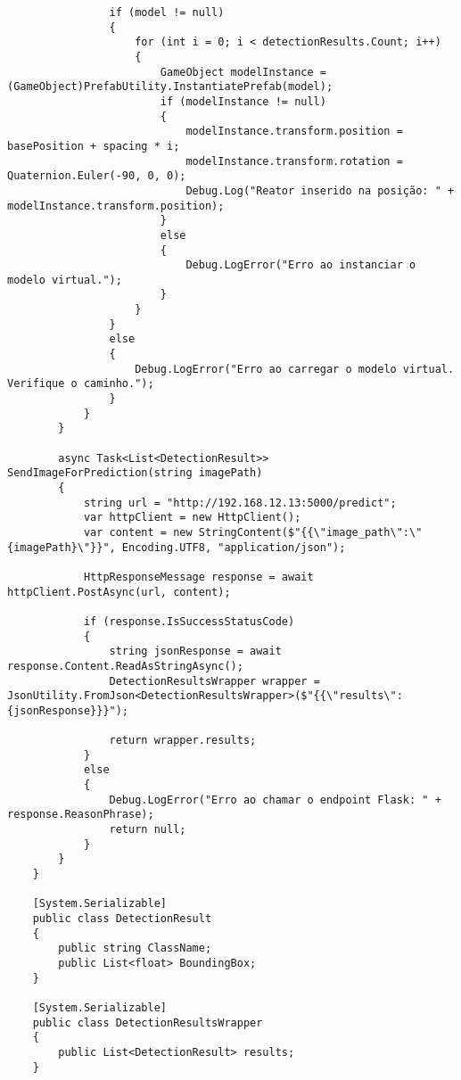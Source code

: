 \begin{lstlisting}
                if (model != null)
                {
                    for (int i = 0; i < detectionResults.Count; i++)
                    {
                        GameObject modelInstance = (GameObject)PrefabUtility.InstantiatePrefab(model);
                        if (modelInstance != null)
                        {
                            modelInstance.transform.position = basePosition + spacing * i;
                            modelInstance.transform.rotation = Quaternion.Euler(-90, 0, 0);
                            Debug.Log("Reator inserido na posição: " + modelInstance.transform.position);
                        }
                        else
                        {
                            Debug.LogError("Erro ao instanciar o modelo virtual.");
                        }
                    }
                }
                else
                {
                    Debug.LogError("Erro ao carregar o modelo virtual. Verifique o caminho.");
                }
            }
        }
    
        async Task<List<DetectionResult>> SendImageForPrediction(string imagePath)
        {
            string url = "http://192.168.12.13:5000/predict";
            var httpClient = new HttpClient();
            var content = new StringContent($"{{\"image_path\":\"{imagePath}\"}}", Encoding.UTF8, "application/json");
    
            HttpResponseMessage response = await httpClient.PostAsync(url, content);
    
            if (response.IsSuccessStatusCode)
            {
                string jsonResponse = await response.Content.ReadAsStringAsync();
                DetectionResultsWrapper wrapper = JsonUtility.FromJson<DetectionResultsWrapper>($"{{\"results\":{jsonResponse}}}");
    
                return wrapper.results;
            }
            else
            {
                Debug.LogError("Erro ao chamar o endpoint Flask: " + response.ReasonPhrase);
                return null;
            }
        }
    }
    
    [System.Serializable]
    public class DetectionResult
    {
        public string ClassName;
        public List<float> BoundingBox;
    }
    
    [System.Serializable]
    public class DetectionResultsWrapper
    {
        public List<DetectionResult> results;
    }

\end{lstlisting}






